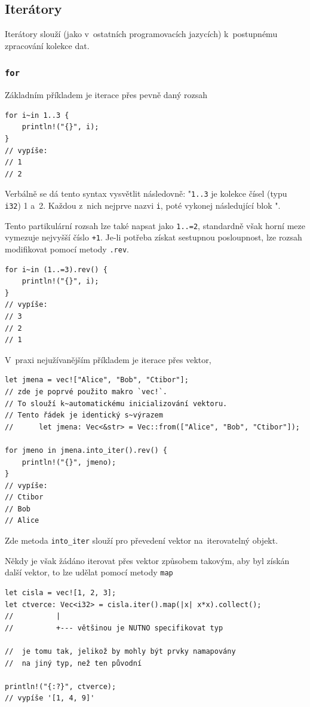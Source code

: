 \documentclass[a4paper, 12pt]{article} %
\newcommand{\rust}[1]{\texttt{#1}}
\begin{document}
	\subsection{Iterátory}
		Iterátory slouží (jako v~ostatních programovacích jazycích) k~postupnému zpracování kolekce dat. 


		\subsubsection*{\rust{for}}
			Základním příkladem je iterace přes pevně daný rozsah
			\begin{verbatim}
for i~in 1..3 {
	println!("{}", i);
}
// vypíše:
// 1
// 2
			\end{verbatim}

			Verbálně se dá tento syntax vysvětlit následovně: "\texttt{1..3} je kolekce čísel (typu \texttt{i32}) 1 a~2. Každou z~nich nejprve nazvi \texttt{i}, poté vykonej následující blok \texttt{\string{\dots\string}}".
			
			Tento partikulární rozsah lze také napsat jako \texttt{1..=2}, standardně však horní meze vymezuje nejvyšší číslo \texttt{+1}. Je-li potřeba získat sestupnou posloupnost, lze rozsah modifikovat pomocí metody \texttt{.rev}.
			\begin{verbatim}
for i~in (1..=3).rev() {
	println!("{}", i);
}
// vypíše:
// 3
// 2
// 1
			\end{verbatim}
			
			V~praxi nejužívanějším příkladem je iterace přes vektor,
			\begin{verbatim}
let jmena = vec!["Alice", "Bob", "Ctibor"];
// zde je poprvé použito makro `vec!`.
// To slouží k~automatickému inicializování vektoru.
// Tento řádek je identický s~výrazem
//      let jmena: Vec<&str> = Vec::from(["Alice", "Bob", "Ctibor"]);

for jmeno in jmena.into_iter().rev() {
	println!("{}", jmeno);
}
// vypíše:
// Ctibor
// Bob
// Alice
			\end{verbatim}
			
			Zde metoda \rust{into_iter} slouží pro převedení vektor na~iterovatelný objekt.
	
			Někdy je však žádáno iterovat přes vektor způsobem takovým, aby byl získán další vektor, to lze udělat pomocí metody \rust{map}
			\begin{verbatim}
let cisla = vec![1, 2, 3];
let ctverce: Vec<i32> = cisla.iter().map(|x| x*x).collect();
//          |
//          +--- většinou je NUTNO specifikovat typ

//  je tomu tak, jelikož by mohly být prvky namapovány
//  na jiný typ, než ten původní

println!("{:?}", ctverce);
// vypíše '[1, 4, 9]'
			\end{verbatim}
	
\end{document}
